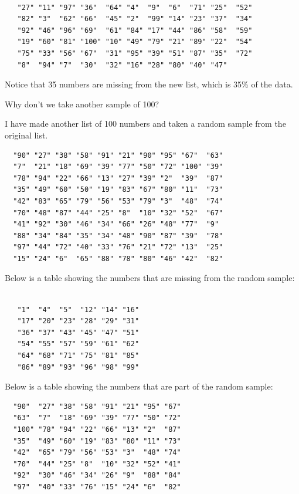 \documentclass[12pt,twoside]{reedthesis}
\begin{document}
  \begin{verbatim}
  
   "27" "11" "97" "36"  "64" "4"  "9"  "6"  "71" "25"  "52" 
   "82" "3"  "62" "66"  "45" "2"  "99" "14" "23" "37"  "34" 
   "92" "46" "96" "69"  "61" "84" "17" "44" "86" "58"  "59" 
   "19" "60" "81" "100" "10" "49" "79" "21" "89" "22"  "54" 
   "75" "33" "56" "67"  "31" "95" "39" "51" "87" "35"  "72" 
   "8"  "94" "7"  "30"  "32" "16" "28" "80" "40" "47"  
  \end{verbatim}
  
  Notice that 35 numbers are missing from the new list, which is 35\% of
  the data.
  
  Why don't we take another sample of 100?
  
  I have made another list of 100 numbers and taken a random sample from
  the original list.
  
  \begin{verbatim}
  "90" "27" "38" "58" "91" "21" "90" "95" "67"  "63" 
  "7"  "21" "18" "69" "39" "77" "50" "72" "100" "39" 
  "78" "94" "22" "66" "13" "27" "39" "2"  "39"  "87" 
  "35" "49" "60" "50" "19" "83" "67" "80" "11"  "73" 
  "42" "83" "65" "79" "56" "53" "79" "3"  "48"  "74" 
  "70" "48" "87" "44" "25" "8"  "10" "32" "52"  "67" 
  "41" "92" "30" "46" "34" "66" "26" "48" "77"  "9"  
  "88" "34" "84" "35" "34" "48" "90" "87" "39"  "78" 
  "97" "44" "72" "40" "33" "76" "21" "72" "13"  "25" 
  "15" "24" "6"  "65" "88" "78" "80" "46" "42"  "82"
  \end{verbatim}
  
  Below is a table showing the numbers that are missing from the random
  sample:
  
  \begin{verbatim}
  
   "1"  "4"  "5"  "12" "14" "16"
   "17" "20" "23" "28" "29" "31"
   "36" "37" "43" "45" "47" "51"
   "54" "55" "57" "59" "61" "62"
   "64" "68" "71" "75" "81" "85"
   "86" "89" "93" "96" "98" "99"
  \end{verbatim}
  
  Below is a table showing the numbers that are part of the random sample:
  
  \begin{verbatim}
  "90"  "27" "38" "58" "91" "21" "95" "67"
  "63"  "7"  "18" "69" "39" "77" "50" "72"
  "100" "78" "94" "22" "66" "13" "2"  "87"
  "35"  "49" "60" "19" "83" "80" "11" "73"
  "42"  "65" "79" "56" "53" "3"  "48" "74"
  "70"  "44" "25" "8"  "10" "32" "52" "41"
  "92"  "30" "46" "34" "26" "9"  "88" "84"
  "97"  "40" "33" "76" "15" "24" "6"  "82"   
  \end{verbatim}
  
\end{document}
